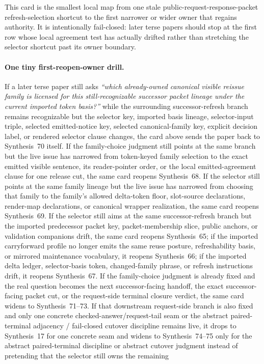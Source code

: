 \documentclass[11pt]{article}
\begin{document}
This card is the smallest local map from one stale public-request-response-packet refresh-selection shortcut to the first narrower or wider owner that regains authority. It is intentionally fail-closed: later terse papers should stop at the first row whose local agreement test has actually drifted rather than stretching the selector shortcut past its owner boundary.

\paragraph{One tiny first-reopen-owner drill.}
If a later terse paper still asks \emph{``which already-owned canonical visible reissue family is licensed for this still-recognizable successor packet lineage under the current imported token basis?''} while the surrounding successor-refresh branch remains recognizable but the selector key, imported basis lineage, selector-input triple, selected emitted-notice key, selected canonical-family key, explicit decision label, or rendered selector clause changes, the card above sends the paper back to Synthesis~70 itself. If the family-choice judgment still points at the same branch but the live issue has narrowed from token-keyed family selection to the exact emitted visible sentence, its reader-pointer order, or the local emitted-agreement clause for one release cut, the same card reopens Synthesis~68. If the selector still points at the same family lineage but the live issue has narrowed from choosing that family to the family's allowed delta-token floor, slot-source declarations, render-map declarations, or canonical wrapper realization, the same card reopens Synthesis~69. If the selector still aims at the same successor-refresh branch but the imported predecessor packet key, packet-membership slice, public anchors, or validation companions drift, the same card reopens Synthesis~65; if the imported carryforward profile no longer emits the same reuse posture, refreshability basis, or mirrored maintenance vocabulary, it reopens Synthesis~66; if the imported delta ledger, selector-basis token, changed-family phrase, or refresh instructions drift, it reopens Synthesis~67. If the family-choice judgment is already fixed and the real question becomes the next successor-facing handoff, the exact successor-facing packet cut, or the request-side terminal closure verdict, the same card widens to Synthesis~71--73. If that downstream request-side branch is also fixed and only one concrete checked-answer/request-tail seam or the abstract paired-terminal adjacency / fail-closed cutover discipline remains live, it drops to Synthesis~17 for one concrete seam and widens to Synthesis~74--75 only for the abstract paired-terminal discipline or abstract cutover judgment instead of pretending that the selector still owns the remaining 
\end{document}
